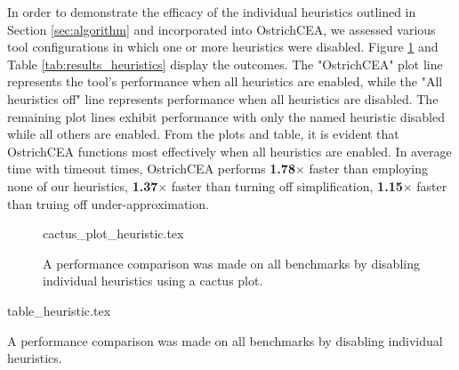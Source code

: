 {%
In order to demonstrate the efficacy of the individual heuristics outlined in Section \ref{sec:algorithm} and incorporated into OstrichCEA, we assessed various tool configurations in which one or more heuristics were disabled. Figure \ref{fig:cactus_heuristics} and Table \ref{tab:results_heuristics} display the outcomes. The "OstrichCEA" plot line represents the tool's performance when all heuristics are enabled, while the "All heuristics off" line represents performance when all heuristics are disabled. The remaining plot lines exhibit performance with only the named heuristic disabled while all others are enabled. From the plots and table, it is evident that OstrichCEA functions most effectively when all heuristics are enabled. In average time with timeout times, OstrichCEA performs \textbf{1.78}$\times$ faster than employing none of our heuristics, \textbf{1.37}$\times$ faster than turning off simplification, \textbf{1.15}$\times$ faster than truing off under-approximation.
\begin{figure}
  {cactus_plot_heuristic.tex}
  \caption{A performance comparison was made on all benchmarks by disabling individual heuristics using a cactus plot.}
  \label{fig:cactus_heuristics}
\end{figure}
\begin{table}
  {table_heuristic.tex}
  \caption{A performance comparison was made on all benchmarks by disabling individual heuristics.}
  \label{tab:results_heuristics}
\end{table}
}
%